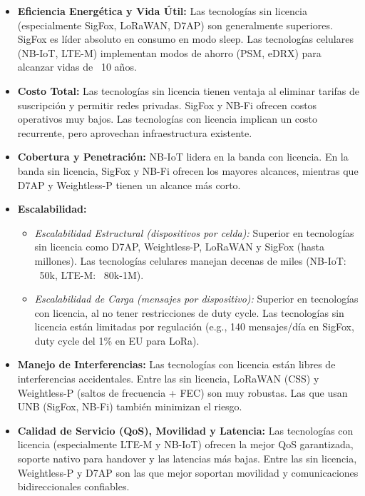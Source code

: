 \begin{itemize}
      \item \textbf{Eficiencia Energética y Vida Útil:} Las tecnologías
            sin licencia (especialmente SigFox, LoRaWAN, D7AP) son  generalmente
            superiores. SigFox es líder absoluto en consumo en modo  sleep.  Las
            tecnologías celulares (NB-IoT, LTE-M) implementan  modos  de  ahorro
            (PSM, eDRX) para alcanzar vidas de ~10 años.
      \item \textbf{Costo Total:} Las tecnologías sin licencia tienen
            ventaja  al  eliminar  tarifas  de  suscripción  y  permitir   redes
            privadas. SigFox y NB-Fi ofrecen costos operativos  muy  bajos.  Las
            tecnologías  con  licencia  implican  un  costo   recurrente,   pero
            aprovechan infraestructura existente.
      \item \textbf{Cobertura y Penetración:} NB-IoT lidera en la banda
            con licencia. En la banda sin licencia, SigFox y NB-Fi  ofrecen  los
            mayores alcances, mientras que D7AP y Weightless-P tienen un alcance
            más corto.
      \item \textbf{Escalabilidad:}
            \begin{itemize}
                  \item \textit{Escalabilidad Estructural (dispositivos por
                              celda):} Superior en tecnologías sin licencia
                        como  D7AP,  Weightless-P,  LoRaWAN  y   SigFox   (hasta
                        millones). Las tecnologías celulares manejan decenas  de
                        miles (NB-IoT: ~50k, LTE-M: ~80k-1M).
                  \item \textit{Escalabilidad de Carga (mensajes por
                              dispositivo):} Superior en tecnologías con
                        licencia, al no tener restricciones de duty  cycle.  Las
                        tecnologías sin licencia están limitadas por  regulación
                        (e.g., 140 mensajes/día en SigFox, duty cycle del 1\% en
                        EU para LoRa).
            \end{itemize}
      \item \textbf{Manejo de Interferencias:} Las tecnologías con
            licencia están libres de interferencias accidentales. Entre las  sin
            licencia, LoRaWAN (CSS) y Weightless-P (saltos de frecuencia +  FEC)
            son muy robustas. Las que usan UNB (SigFox, NB-Fi) también minimizan
            el riesgo.
      \item \textbf{Calidad de Servicio (QoS), Movilidad y Latencia:} Las
            tecnologías con licencia (especialmente LTE-M y NB-IoT)  ofrecen  la
            mejor QoS garantizada, soporte nativo para handover y las  latencias
            más bajas. Entre las sin licencia, Weightless-P y D7AP son  las  que
            mejor   soportan   movilidad   y   comunicaciones    bidireccionales
            confiables.
\end{itemize}


